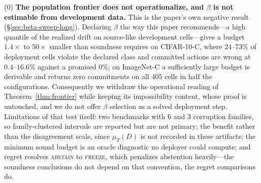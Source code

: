 \documentclass[conference]{IEEEtran}
\theoremstyle{plain}
\theoremstyle{definition}
\begin{document}
\begin{center}
\end{center}

\medskip
(0) \textbf{The population frontier does not operationalize, and $\beta$ is not estimable from
development data.} This is the paper's own negative result (\S\ref{sec:beta-sweep-long}). Declaring
$\beta$ the way this paper recommends---a high quantile of the realized drift on source-like
development cells---gives a budget $1.4\times$ to $50\times$ smaller than soundness requires on
CIFAR-10-C, where $24$--$73\%$ of deployment cells violate the declared class and committed actions
are wrong at $0.4$--$16.6\%$ against a promised $0\%$; on ImageNet-C a sufficiently large budget is
derivable and returns zero commitments on all $405$ cells in half the configurations. Consequently
we withdraw the operational reading of Theorem~\ref{thm:frontier} while keeping its impossibility
content, whose proof is untouched, and we do not offer $\beta$ selection as a solved deployment
step. Limitations of that test itself: two benchmarks with $6$ and $3$ corruption families, so
family-clustered intervals are reported but are not primary; the benefit rather than the
disagreement scale, since $\mu_T(D)$ is not recorded in these artifacts; the minimum sound budget is
an oracle diagnostic no deployer could compute; and regret resolves \textsc{abstain} to
\textsc{freeze}, which penalizes abstention heavily---the soundness conclusions do not depend on
that convention, the regret comparisons do.
\end{document}
